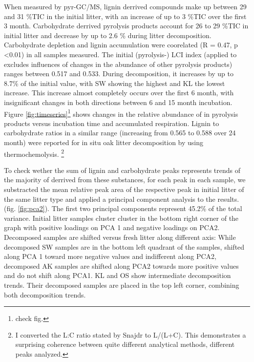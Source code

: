 \documentclass[authoryear,preprint,review,12pt]{elsarticle}
\begin{document}
When measured by pyr-GC/MS, lignin derrived compounds make up between 29 and 31 \%TIC in the initial litter, with an increase of up to 3 \%TIC over the first 3 month. Carbohydrate derrived pyrolysis products account for 26 to 29 \%TIC in initial litter and decrease by up to 2.6 \% during litter decomposition. Carbohydrate depletion and lignin accumulation were coorelated (R = 0.47, p \textless 0.01) in all samples measured. The initial (pyrolysis-) LCI index (applied to excludes influences of changes in the abundance of other pyrolysis products) ranges between 0.517 and 0.533. During decomposition, it increases by up to 8.7\% of the initial value, with SW showing the highest and KL the lowest increase. This increase almost completely occurs over the first 6 month, with insignificant changes in both directions between 6 and 15 month incubation. Figure \ref{fig:timeseries}\footnote{check fig.} shows changes in the relative abundance of in pyrolysis products versus incubation time and accumulated respiration. Lignin to carbohydrate ratios in a similar range (increasing from 0.565 to 0.588 over 24 month) were reported for in situ oak litter decomposition by \cite{Snajdr2010} using thermochemolysis. \footnote{I converted the L:C ratio stated by Snajdr to L/(L+C). This demonstrates a surprising coherence between quite different analytical methods, different peaks analyzed.}



To check wether the sum of lignin and carbohydrate peaks represents trends of the majority of derrived from these substances, for each peak in each sample, we substracted the mean relative peak area of the respective peak in initial litter of the same litter type and applied a principal component analysis to the results. (fig. \ref{fig:pca2}). The first two principal components represent 45.2\% of the total variance. Initial litter samples cluster cluster in the bottom right corner of the graph with positive loadings on PCA 1 and negative loadings on PCA2. Decomposed samples are shifted versus fresh litter along different axis: While decomposed SW samples are in the bottom left quadrant of the samples, shifted along PCA 1 toward more negative values and indifferent along PCA2, decomposed AK samples are shifted along PCA2 towards more positive values and do not shift along PCA1. KL and OS show intermediate decomposition trends. Their decomposed samples are placed in the top left corner, combining both decomposition trends.
\end{document}
